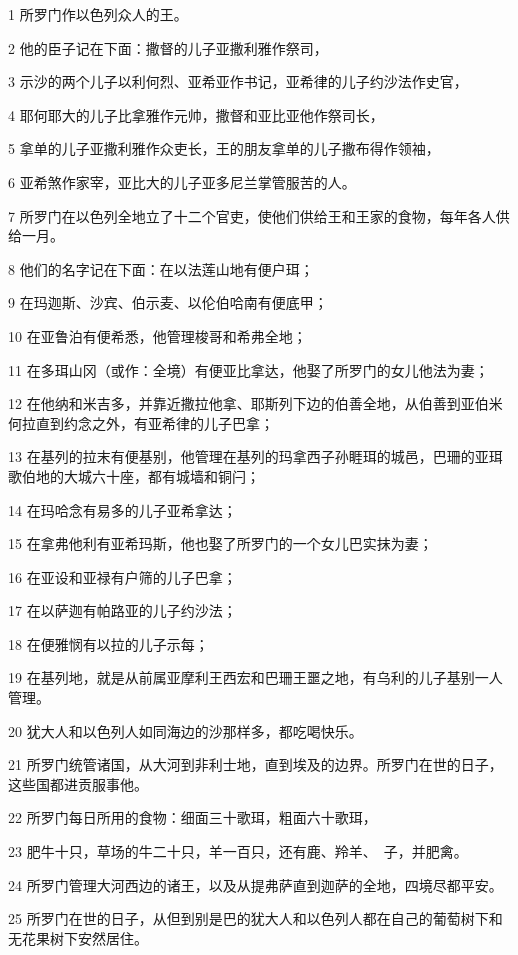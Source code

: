 \par 1 所罗门作以色列众人的王。
\par 2 他的臣子记在下面：撒督的儿子亚撒利雅作祭司，
\par 3 示沙的两个儿子以利何烈、亚希亚作书记，亚希律的儿子约沙法作史官，
\par 4 耶何耶大的儿子比拿雅作元帅，撒督和亚比亚他作祭司长，
\par 5 拿单的儿子亚撒利雅作众吏长，王的朋友拿单的儿子撒布得作领袖，
\par 6 亚希煞作家宰，亚比大的儿子亚多尼兰掌管服苦的人。
\par 7 所罗门在以色列全地立了十二个官吏，使他们供给王和王家的食物，每年各人供给一月。
\par 8 他们的名字记在下面：在以法莲山地有便户珥；
\par 9 在玛迦斯、沙宾、伯示麦、以伦伯哈南有便底甲；
\par 10 在亚鲁泊有便希悉，他管理梭哥和希弗全地；
\par 11 在多珥山冈（或作：全境）有便亚比拿达，他娶了所罗门的女儿他法为妻；
\par 12 在他纳和米吉多，并靠近撒拉他拿、耶斯列下边的伯善全地，从伯善到亚伯米何拉直到约念之外，有亚希律的儿子巴拿；
\par 13 在基列的拉末有便基别，他管理在基列的玛拿西子孙睚珥的城邑，巴珊的亚珥歌伯地的大城六十座，都有城墙和铜闩；
\par 14 在玛哈念有易多的儿子亚希拿达；
\par 15 在拿弗他利有亚希玛斯，他也娶了所罗门的一个女儿巴实抹为妻；
\par 16 在亚设和亚禄有户筛的儿子巴拿；
\par 17 在以萨迦有帕路亚的儿子约沙法；
\par 18 在便雅悯有以拉的儿子示每；
\par 19 在基列地，就是从前属亚摩利王西宏和巴珊王噩之地，有乌利的儿子基别一人管理。
\par 20 犹大人和以色列人如同海边的沙那样多，都吃喝快乐。
\par 21 所罗门统管诸国，从大河到非利士地，直到埃及的边界。所罗门在世的日子，这些国都进贡服事他。
\par 22 所罗门每日所用的食物：细面三十歌珥，粗面六十歌珥，
\par 23 肥牛十只，草场的牛二十只，羊一百只，还有鹿、羚羊、　子，并肥禽。
\par 24 所罗门管理大河西边的诸王，以及从提弗萨直到迦萨的全地，四境尽都平安。
\par 25 所罗门在世的日子，从但到别是巴的犹大人和以色列人都在自己的葡萄树下和无花果树下安然居住。
